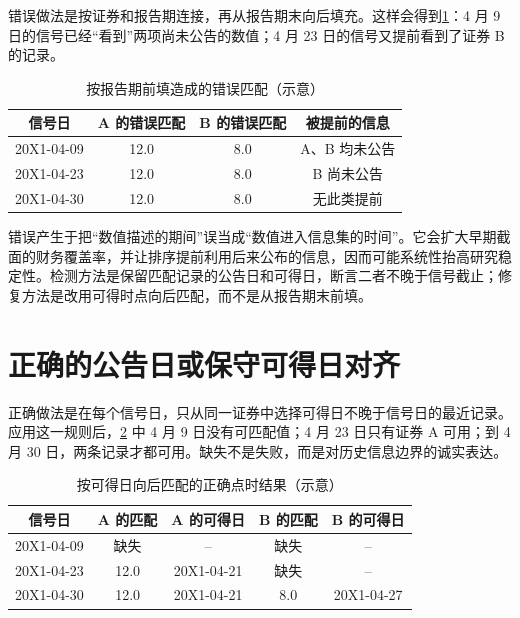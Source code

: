 错误做法是按证券和报告期连接，再从报告期末向后填充。这样会得到\cref{tab:ch02-wrong-alignment}：4 月 9 日的信号已经“看到”两项尚未公告的数值；4 月 23 日的信号又提前看到了证券 B 的记录。

\begin{table}[htbp]
  \centering
  \small
  \caption{按报告期前填造成的错误匹配（示意）}
  \label{tab:ch02-wrong-alignment}
  \begin{tabular}{@{}cccc@{}}
    \toprule
    信号日 & A 的错误匹配 & B 的错误匹配 & 被提前的信息 \\
    \midrule
    20X1-04-09 & 12.0 & 8.0 & A、B 均未公告 \\
    20X1-04-23 & 12.0 & 8.0 & B 尚未公告 \\
    20X1-04-30 & 12.0 & 8.0 & 无此类提前 \\
    \bottomrule
  \end{tabular}
\end{table}

\begin{warningbox}
错误产生于把“数值描述的期间”误当成“数值进入信息集的时间”。它会扩大早期截面的财务覆盖率，并让排序提前利用后来公布的信息，因而可能系统性抬高研究稳定性。检测方法是保留匹配记录的公告日和可得日，断言二者不晚于信号截止；修复方法是改用可得时点向后匹配，而不是从报告期末前填。
\end{warningbox}

\section{正确的公告日或保守可得日对齐}

正确做法是在每个信号日，只从同一证券中选择可得日不晚于信号日的最近记录。应用这一规则后，\cref{tab:ch02-correct-alignment} 中 4 月 9 日没有可匹配值；4 月 23 日只有证券 A 可用；到 4 月 30 日，两条记录才都可用。缺失不是失败，而是对历史信息边界的诚实表达。

\begin{table}[htbp]
  \centering
  \small
  \caption{按可得日向后匹配的正确点时结果（示意）}
  \label{tab:ch02-correct-alignment}
  \begin{tabular}{@{}ccccc@{}}
    \toprule
    信号日 & A 的匹配 & A 的可得日 & B 的匹配 & B 的可得日 \\
    \midrule
    20X1-04-09 & 缺失 & -- & 缺失 & -- \\
    20X1-04-23 & 12.0 & 20X1-04-21 & 缺失 & -- \\
    20X1-04-30 & 12.0 & 20X1-04-21 & 8.0 & 20X1-04-27 \\
    \bottomrule
  \end{tabular}
\end{table}


